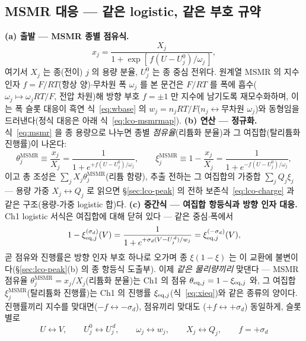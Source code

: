 \subsection{MSMR 대응 --- 같은 logistic, 같은 부호 규약}\label{sec:lco-code-msmr}
\textbf{(a) 출발 --- MSMR 종별 점유식.}
\begin{equation}
x_j=\frac{X_j}{1+\exp[\,f(U-U_j^0)/\omega_j\,]},
\label{eq:msmr}
\end{equation}
여기서 $X_j$ 는 종(전이) $j$ 의 용량 분율, $U_j^0$ 는 종 중심 전위다. 원계열 MSMR 의 지수 인자
$f=F/RT$(항상 양)$\cdot$무차원 폭 $\omega_j$ 를 본 문건은 $F/RT$ 를 폭에 흡수($\omega_j\mapsto\omega_jRT/F$,
전압 차원)해 방향 부호 $f=\pm1$ 만 지수에 남기도록 재모수화하며, 이는 폭 슬롯 대응이 흑연
식~\eqref{eq:wbase} 의 $w_j=n_jRT/F$($n_j\leftrightarrow$무차원 $\omega_j$)와 동형임을 드러낸다(정식
대응은 아래 식~\eqref{eq:lco-msmrmap}).
\textbf{(b) 연산 --- 정규화.} 식~\eqref{eq:msmr} 을 종 용량으로 나누면
종별 \emph{점유율}(리튬화 분율)과 그 여집합(탈리튬화 진행률)이 나온다:
\begin{equation}
\theta_j^{\mathrm{MSMR}}\equiv\frac{x_j}{X_j}=\frac{1}{1+e^{+f(U-U_j^0)/\omega_j}},\qquad
\xi_j^{\mathrm{MSMR}}\equiv1-\frac{x_j}{X_j}=\frac{1}{1+e^{-f(U-U_j^0)/\omega_j}},
\label{eq:lco-msmrnorm}
\end{equation}
이고 총 조성은 $\sum_jX_j\theta_j^{\mathrm{MSMR}}$(리튬 함량), 추출 전하는 그 여집합의 가중합
$\sum_jQ_j\xi_j$ --- 용량 가중 $X_j\!\leftrightarrow\!Q_j$ 로 읽으면 \S\ref{sec:lco-peak} 의 전하
보존식~\eqref{eq:lco-charge} 과 같은 구조(용량-가중 logistic 합)다.
\textbf{(c) 중간식 --- 여집합 항등식과 방향 인자 대응.} Ch1 logistic 서식은 여집합에 대해 닫혀 있다 ---
같은 중심$\cdot$폭에서
\begin{equation}
1-\xi_{\mathrm{eq},j}^{(\sigma_d)}(V)
=\frac{1}{1+e^{+\sigma_d(V-U_j^{\,d})/w_j}}
=\xi_{\mathrm{eq},j}^{(-\sigma_d)}(V),
\label{eq:lco-comp}
\end{equation}
곧 점유와 진행률은 방향 인자 부호 하나로 오가며 종 $\xi(1-\xi)$ 는 이 교환에 불변이다(\S\ref{sec:lco-peak}(b) 의 종 항등식 도출부). 이제 \emph{같은 물리량끼리} 맞댄다 --- MSMR 점유율
$\theta_j^{\mathrm{MSMR}}=x_j/X_j$(리튬화 분율)는 Ch1 의 점유 $\theta_{\mathrm{eq},j}=1-\xi_{\mathrm{eq},j}$ 와, 그 여집합
$\xi_j^{\mathrm{MSMR}}$(탈리튬화 진행률)는 Ch1 의 진행률 $\xi_{\mathrm{eq},j}$(식~\eqref{eq:xieq})와 같은 종류의
양이다. 진행률끼리 지수를 맞대면($-f\leftrightarrow-\sigma_d$), 점유끼리 맞대도
($+f\leftrightarrow+\sigma_d$) 동일하게, 슬롯별로
\begin{equation}
U\leftrightarrow V,\qquad U_j^0\leftrightarrow U_j^{\,d},\qquad
\omega_j\leftrightarrow w_j,\qquad X_j\leftrightarrow Q_j,\qquad
f=+\sigma_d
\label{eq:lco-msmrmap}
\end{equation}
